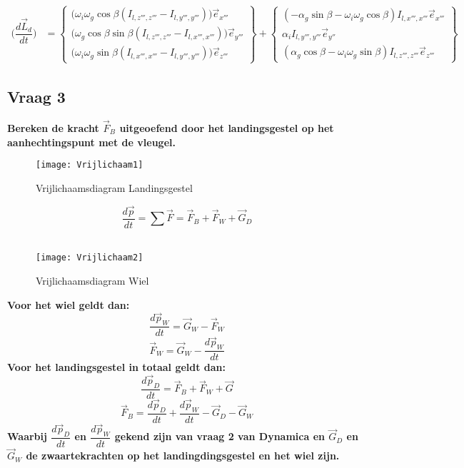 \documentclass[a4paper,10pt]{article}
\begin{document}
\begin{equation}
	\begin{aligned}
	\Big(\dfrac{d\vec{L}_d}{dt}\Big) &= \begin{Bmatrix}
	\Big( \omega_i \omega_g\cos{\beta} (I_{l,z''',z'''} - I_{l,y''',y'''}) \Big) \vec{e}_{x'''}\\
	\Big(\omega_g\cos{\beta}\sin{\beta}(I_{l,z''',z'''} - I_{l,x''',x'''})\Big) \vec{e}_{y'''} \\
	\Big(\omega_i \omega_g\sin{\beta}(I_{l,x''',x'''} - I_{l,y''',y'''})\Big)\vec{e}_{z'''}
	\end{Bmatrix} + \begin{Bmatrix}
	(-\alpha_g \sin{\beta} - \omega_i\omega_g\cos{\beta})I_{l,x''',x'''}\vec{e}_{x'''}\\
	\alpha_iI_{l,y''',y'''}\vec{e}_{y''}\\
	(\alpha_g\cos{\beta}-\omega_i\omega_g\sin{\beta})I_{l,z''',z'''}\vec{e}_{z'''}
	\end{Bmatrix}
	\end{aligned}
\end{equation}
\subsection{Vraag 3}
\textbf{Bereken de kracht $\vec{F}_B$ uitgeoefend door het landingsgestel op het aanhechtingspunt met de vleugel.}

\begin{figure}[H]
\centering
\texttt{[image: Vrijlichaam1]}
\caption{Vrijlichaamsdiagram Landingsgestel}
\label{fig:Vrijlichaamsdiagram Landingsgestel}
\end{figure}
\begin{equation}
\dfrac{d\vec{p}}{dt} = \sum	\vec{F}	= \vec{F}_B + \vec{F}_W + \vec{G}_D
\end{equation}\\
\begin{figure}[H]
	\centering
	\texttt{[image: Vrijlichaam2]}
	\caption{Vrijlichaamsdiagram Wiel}
	\label{fig:Vrijlichaamsdiagram Wiel}
\end{figure}

\textbf{Voor het wiel geldt dan:}
\begin{equation}
	\dfrac{d\vec{p}_W}{dt} = \vec{G}_W -\vec{F}_W
\end{equation}
\begin{equation}
	\vec{F}_W = \vec{G}_W - \dfrac{d\vec{p}_W}{dt}
\end{equation}
\textbf{Voor het landingsgestel in totaal geldt dan:}
\begin{equation}
	\dfrac{d\vec{p}_D}{dt} 	= \vec{F}_B + \vec{F}_W + \vec{G}
\end{equation}
\begin{equation}
	\vec{F}_B = \dfrac{d\vec{p}_D}{dt} + \dfrac{d\vec{p}_W}{dt} - \vec{G}_D - \vec{G}_W
\end{equation}
\textbf{Waarbij $\dfrac{d\vec{p}_D}{dt}$ en $\dfrac{d\vec{p}_W}{dt}$ gekend zijn van vraag 2 van Dynamica en $\vec{G}_D$ en $\vec{G}_W$ de zwaartekrachten op het landingdingsgestel en het wiel zijn.}
\end{document}

